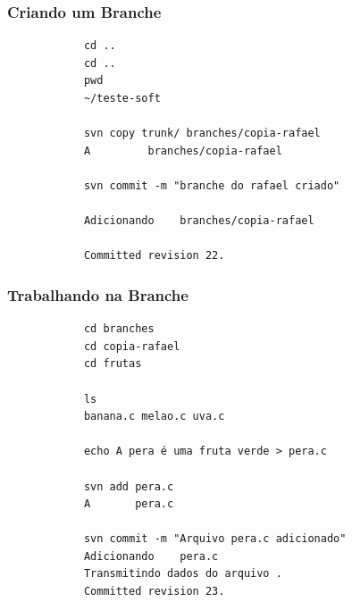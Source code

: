 \documentclass{beamer}
\begin{document}
\begin{frame}[fragile]
    \frametitle{Criando um Branche}

    \begin{bash}{}
        {\tiny
            \begin{verbatim}
            cd ..
            cd ..
            pwd
            ~/teste-soft

            svn copy trunk/ branches/copia-rafael
            A         branches/copia-rafael

            svn commit -m "branche do rafael criado"

            Adicionando    branches/copia-rafael

            Committed revision 22.
            \end{verbatim}
        }
    \end{bash}

\end{frame}


\begin{frame}[fragile]
    \frametitle{Trabalhando na Branche}

    \begin{bash}{}
        {\tiny
            \begin{verbatim}
            cd branches
            cd copia-rafael
            cd frutas

            ls
            banana.c melao.c uva.c

            echo A pera é uma fruta verde > pera.c

            svn add pera.c
            A       pera.c

            svn commit -m "Arquivo pera.c adicionado"
            Adicionando    pera.c
            Transmitindo dados do arquivo .
            Committed revision 23.
            \end{verbatim}
        }
    \end{bash}

\end{frame}
\end{document}
